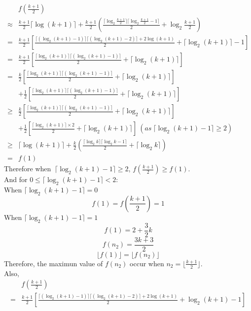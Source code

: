 \documentclass[fleqn,a4paper,12pt]{article}
\begin{document}
\begin{enumerate}
\begin{itemize}
     \begin{align*}
       &f( \frac{k+1}{2} )\\
       \approx& \frac{k+1}{2} \lceil \log (k+1) \rceil + \frac{k+1}{2}( \frac{ \lceil \log_2 \frac{k+1}{2}  \rceil \lceil \log_2 \frac{k+1}{2}  - 1\rceil }{2} + \log_2 \frac{k+1}{2} )\\
       =& \frac{k+1}{2} [\frac{ \lceil (\log_2 (k+1) -1 ) \rceil \lceil (\log_2 (k+1) - 2 ) \rceil + 2\log(k+1) }{2} + \lceil \log_2 (k+1) \rceil - 1 ]\\
       =& \frac{k+1}{2} [\frac{ \lceil \log_2 (k+1) \rceil \lceil (\log_2 (k+1) - 1 ) \rceil }{2} + \lceil \log_2 (k+1) \rceil  ]\\
       = & \frac{k}{2} [\frac{ \lceil \log_2 (k+1) \rceil \lceil (\log_2 (k+1) - 1 ) \rceil }{2} + \lceil \log_2 (k+1) \rceil  ]\\
         &+\frac{1}{2} [\frac{ \lceil \log_2 (k+1) \rceil \lceil (\log_2 (k+1) - 1 ) \rceil }{2} + \lceil \log_2 (k+1) \rceil  ]\\
       \geq & \frac{k}{2} [\frac{ \lceil \log_2 (k+1) \rceil \lceil (\log_2 (k+1) - 1 ) \rceil }{2} + \lceil \log_2 (k+1) \rceil  ]\\
       &+\frac{1}{2} [\frac{ \lceil \log_2 (k+1) \rceil \times 2 }{2} + \lceil \log_2 (k+1) \rceil ] \ ( as\ \lceil \log_2 (k+1) - 1 \rceil \geq 2 )\\
       \geq& \lceil \log (k+1) \rceil + \frac{k}{2} ( \frac{ \lceil \log_2 k \rceil \lceil \log_2 k - 1 \rceil }{2} + \lceil \log_2 k \rceil ) \\
       =& f(1)
     \end{align*}
     Therefore when $ \ \lceil \log_2 (k+1) - 1 \rceil \geq 2  $, $ f( \frac{k+1}{2} ) \geq f(1) $.\\
     And for $ 0 \leq \lceil \log_2 (k+1) - 1 \rceil < 2 $:\\
     When $ \lceil \log_2 (k+1) - 1 \rceil = 0 $ \\
     \[ f(1) = f( \frac{k+1}{2} ) = 1 \]
     When $ \lceil \log_2 (k+1) - 1 \rceil = 1 $ \\
     \[ f(1) = 2 + \frac{3}{2} k \]
     \[ f(n_2) = \frac{3k+3}{2} \]
     \[ \lfloor f(1) \rfloor = \lfloor f(n_2) \rfloor \]
     Therefore, the maximun value of $f(n_2)$ occur when $n_2 = \lfloor \frac{k+1}{2} \rfloor $.\\
     Also, 
     \begin{align*}
       &f( \frac{k+1}{2}  )\\
       =& \frac{k+1}{2} [\frac{ \lceil (\log_2 (k+1) -1 ) \rceil \lceil (\log_2 (k+1) - 2 ) \rceil + 2\log(k+1) }{2} + \log_2 (k+1) - 1 ]\\

\end{align*}
\end{itemize}
\end{enumerate}
\end{document}
